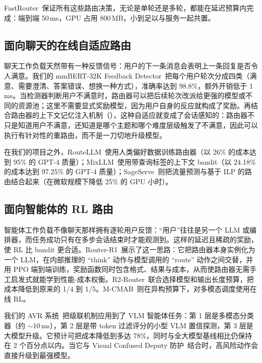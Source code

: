 FastRouter~\cite{fastrouter2026}保证所有这些路由决策，无论是单轮还是多轮，都能在延迟预算内完成：端到端 50\,ms，GPU 占用 800\,MB，小到足以与服务一起共置。

\subsection{面向聊天的在线自适应路由}
\label{sec:router:online}

聊天工作负载天然带有一种反馈信号：用户的下一条消息会表明上一条回复是否令人满意。我们的 mmBERT-32K Feedback Detector~\cite{feedbackdet2026}把每个用户轮次分成四类（满意、需要澄清、答案错误、想换一种方式），准确率达到 98.8\%，额外开销低于 1\,ms。当检测器判断用户不满意时，路由器可以把后续轮次改派给更强的模型或不同的资源池；这里不需要显式奖励模型，因为用户自身的反应就构成了奖励。再结合路由器的上下文记忆注入机制（），这种自适应就变成了会话感知的：路由器不只是知道用户不满意，还知道是哪个主题和哪个难度层级触发了不满意，因此可以执行有针对性的重路由，而不是一刀切地升级模型。

在我们的项目之外，RouteLLM~\cite{ong2025routellm}使用人类偏好数据训练路由器（以 26\% 的成本达到 95\% 的 GPT-4 质量）；MixLLM~\cite{lu2025mixllm}使用带查询标签的上下文 bandit（以 24.18\% 的成本达到 97.25\% 的 GPT-4 质量）；SageServe~\cite{jia2025sageserve}则把流量预测与基于 ILP 的路由结合起来（在微软规模下降低 25\% 的 GPU 小时）。

\subsection{面向智能体的 RL 路由}
\label{sec:router:rl}

智能体工作负载不像聊天那样拥有逐轮用户反馈：“用户”往往是另一个 LLM 或编排器，而任务成功只有在多步会话结束时才能观测到。这样的延迟且稀疏的奖励，使 RL 比 bandit 更合适。Router-R1~\cite{routerr1_2025}展示了这一思路：它把路由器本身实例化为一个 LLM，在内部推理的 “think” 动作与模型调用的 “route” 动作之间交替，并用 PPO 端到端训练，奖励函数同时包含格式、结果与成本，从而使路由器无需手工启发式就能学到性能-成本权衡。R2-Router~\cite{r2router2026}联合选择模型和输出长度预算，把成本降低到原来的 1/4 到 1/5。M-CMAB~\cite{mcmab2026}则在异构预算下，对多模态调度使用在线 RL。

我们的 AVR 系统~\cite{avr2026}把级联机制应用到了 VLM 智能体任务：第 1 层是多模态分类器（约 $\sim$10\,ms），第 2 层是带 token 过滤评分的小型 VLM 置信探测，第 3 层是大模型升级。它预计可把成本降低到多达 78\%，同时与全大模型基线相比仍保持在 2 个百分点以内。当它与 Visual Confused Deputy 防护~\cite{vcd2026}结合时，高风险动作会直接升级到最强模型。

